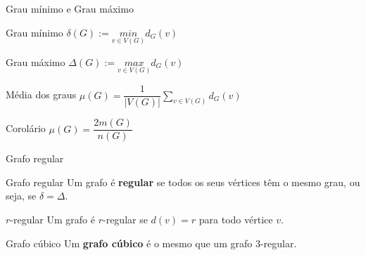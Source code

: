 \documentclass[xcolor=dvipsnames,table]{beamer}
\begin{document}
	\begin{frame}[shrink]{Grau mínimo e Grau máximo}
		\begin{block}{Grau mínimo}
			$\delta(G) :=  \underset{v \in V(G)}{min} d_G(v)$
		\end{block} \pause
		\begin{block}{Grau máximo}
			$\Delta(G) :=  \underset{v \in V(G)}{max} d_G(v)$
		\end{block} \pause
		\begin{block}{Média dos graus}
			$\mu(G) =  \dfrac{1}{|V(G)|} \underset{v \in V(G)}{\sum} d_G(v)$
		\end{block} \pause
		\begin{block}{Corolário}
			$\mu(G) = \dfrac{2m(G)}{n(G)}$
		\end{block}
	\end{frame}
	
	\begin{frame}{Grafo regular}
		\begin{block}{Grafo regular}
			Um grafo é {\bf regular} se todos os seus vértices têm o mesmo grau, ou seja, se $\delta = \Delta$.
		\end{block} \pause
		\begin{block}{$r$-regular}
			Um grafo é $r$-regular se $d(v) = r$ para todo vértice $v$.
		\end{block} \pause
		\begin{block}{Grafo cúbico}
			Um {\bf grafo cúbico} é o mesmo que um grafo 3-regular.
		\end{block}
	\end{frame}
	
	\begin{frame}
		\titlepage
	\end{frame}
	
\end{document}
